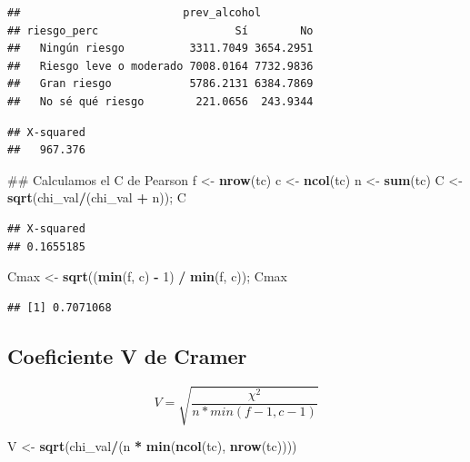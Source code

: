 \documentclass[spanish,]{book}
\newenvironment{Shaded}{\begin{snugshade}}{\end{snugshade}}
\newcommand{\KeywordTok}[1]{\textcolor[rgb]{0.13,0.29,0.53}{\textbf{#1}}}
\newcommand{\DecValTok}[1]{\textcolor[rgb]{0.00,0.00,0.81}{#1}}
\newcommand{\StringTok}[1]{\textcolor[rgb]{0.31,0.60,0.02}{#1}}
\newcommand{\OperatorTok}[1]{\textcolor[rgb]{0.81,0.36,0.00}{\textbf{#1}}}
\newcommand{\NormalTok}[1]{#1}
\begin{document}
\begin{verbatim}
##                         prev_alcohol
## riesgo_perc                     Sí        No
##   Ningún riesgo          3311.7049 3654.2951
##   Riesgo leve o moderado 7008.0164 7732.9836
##   Gran riesgo            5786.2131 6384.7869
##   No sé qué riesgo        221.0656  243.9344
\end{verbatim}

\begin{Shaded}
\end{Shaded}

\begin{verbatim}
## X-squared 
##   967.376
\end{verbatim}

\begin{Shaded}
\begin{Highlighting}[]
\NormalTok{## Calculamos el C de Pearson}
\NormalTok{f <-}\StringTok{ }\KeywordTok{nrow}\NormalTok{(tc)}
\NormalTok{c <-}\StringTok{ }\KeywordTok{ncol}\NormalTok{(tc)}
\NormalTok{n <-}\StringTok{ }\KeywordTok{sum}\NormalTok{(tc)}
\NormalTok{C <-}\StringTok{ }\KeywordTok{sqrt}\NormalTok{(chi_val}\OperatorTok{/}\NormalTok{(chi_val }\OperatorTok{+}\StringTok{ }\NormalTok{n)); C}
\end{Highlighting}
\end{Shaded}

\begin{verbatim}
## X-squared 
## 0.1655185
\end{verbatim}

\begin{Shaded}
\begin{Highlighting}[]
\NormalTok{Cmax <-}\StringTok{ }\KeywordTok{sqrt}\NormalTok{((}\KeywordTok{min}\NormalTok{(f, c) }\OperatorTok{-}\StringTok{ }\DecValTok{1}\NormalTok{) }\OperatorTok{/}\StringTok{ }\KeywordTok{min}\NormalTok{(f, c)); Cmax}
\end{Highlighting}
\end{Shaded}

\begin{verbatim}
## [1] 0.7071068
\end{verbatim}

\subsection{Coeficiente V de Cramer}\label{coeficiente-v-de-cramer}

\[
V = \sqrt{\frac{\chi^2}{n * min(f - 1, c-1)}}
\]

\begin{Shaded}
\begin{Highlighting}[]
\NormalTok{V <-}\StringTok{ }\KeywordTok{sqrt}\NormalTok{(chi_val}\OperatorTok{/}\NormalTok{(n }\OperatorTok{*}\StringTok{ }\KeywordTok{min}\NormalTok{(}\KeywordTok{ncol}\NormalTok{(tc), }\KeywordTok{nrow}\NormalTok{(tc))))}
\end{Highlighting}
\end{Shaded}


\end{document}
